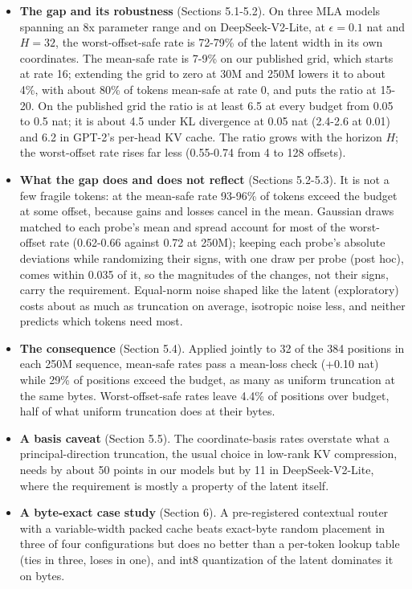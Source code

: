 \documentclass[11pt]{article}
\begin{document}
\begin{itemize}

\item \textbf{The gap and its robustness} (Sections 5.1-5.2). On three MLA models spanning an 8x parameter range and on DeepSeek-V2-Lite, at $\epsilon=0.1$ nat and $H=32$, the worst-offset-safe rate is 72-79\% of the latent width in its own coordinates. The mean-safe rate is 7-9\% on our published grid, which starts at rate 16; extending the grid to zero at 30M and 250M lowers it to about 4\%, with about 80\% of tokens mean-safe at rate 0, and puts the ratio at 15-20. On the published grid the ratio is at least 6.5 at every budget from 0.05 to 0.5 nat; it is about 4.5 under KL divergence at 0.05 nat (2.4-2.6 at 0.01) and 6.2 in GPT-2's per-head KV cache. The ratio grows with the horizon $H$; the worst-offset rate rises far less (0.55-0.74 from 4 to 128 offsets).

\item \textbf{What the gap does and does not reflect} (Sections 5.2-5.3). It is not a few fragile tokens: at the mean-safe rate 93-96\% of tokens exceed the budget at some offset, because gains and losses cancel in the mean. Gaussian draws matched to each probe's mean and spread account for most of the worst-offset rate (0.62-0.66 against 0.72 at 250M); keeping each probe's absolute deviations while randomizing their signs, with one draw per probe (post hoc), comes within 0.035 of it, so the magnitudes of the changes, not their signs, carry the requirement. Equal-norm noise shaped like the latent (exploratory) costs about as much as truncation on average, isotropic noise less, and neither predicts which tokens need most.

\item \textbf{The consequence} (Section 5.4). Applied jointly to 32 of the 384 positions in each 250M sequence, mean-safe rates pass a mean-loss check (+0.10 nat) while 29\% of positions exceed the budget, as many as uniform truncation at the same bytes. Worst-offset-safe rates leave 4.4\% of positions over budget, half of what uniform truncation does at their bytes.

\item \textbf{A basis caveat} (Section 5.5). The coordinate-basis rates overstate what a principal-direction truncation, the usual choice in low-rank KV compression, needs by about 50 points in our models but by 11 in DeepSeek-V2-Lite, where the requirement is mostly a property of the latent itself.

\item \textbf{A byte-exact case study} (Section 6). A pre-registered contextual router with a variable-width packed cache beats exact-byte random placement in three of four configurations but does no better than a per-token lookup table (ties in three, loses in one), and int8 quantization of the latent dominates it on bytes.

\end{itemize}
\end{document}
